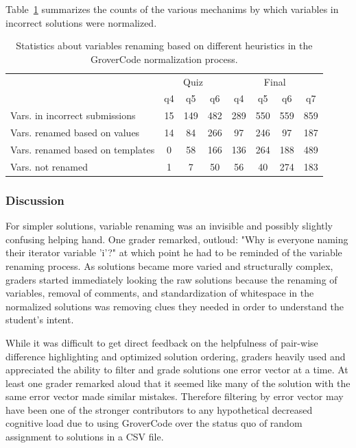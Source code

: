 Table~\ref{table:renametype} summarizes the counts of the various mechanims by which variables in incorrect solutions were normalized.

\begin{table}
\centering
\begin{tabular}{|l|c|c|c|c|c|c|c|}
\hline
& \multicolumn{3}{c|}{Quiz} & \multicolumn{4}{c|}{Final} \\
\cline{2-8}
& q4 & q5 & q6 & q4 & q5 & q6 & q7 \\
\hline
Vars. in incorrect submissions & 15 & 149 & 482 & 289 & 550 & 559 & 859 \\
\hline
Vars. renamed based on values & 14 & 84 & 266 & 97 & 246 & 97 & 187 \\
\hline
Vars. renamed based on templates & 0 & 58 & 166 & 136 & 264 & 188 & 489 \\
\hline
Vars. not renamed & 1 & 7 & 50 & 56 & 40 & 274 & 183 \\
\hline
\end{tabular}
\caption{Statistics about variables renaming based on different heuristics in the GroverCode normalization process.}
\label{table:renametype}
\end{table}
 
\subsubsection{Discussion}
For simpler solutions, variable renaming was an invisible and possibly slightly confusing helping hand. One grader remarked, outloud: "Why is everyone naming their iterator variable 'i'?" at which point he had to be reminded of the variable renaming process. As solutions became more varied and structurally complex, graders started immediately looking the raw solutions because the renaming of variables, removal of comments, and standardization of whitespace in the normalized solutions was removing clues they needed in order to understand the student's intent.

While it was difficult to get direct feedback on the helpfulness of pair-wise difference highlighting and optimized solution ordering, graders heavily used and appreciated the ability to filter and grade solutions one error vector at a time. At least one grader remarked aloud that it seemed like many of the solution with the same error vector made similar mistakes. Therefore filtering by error vector may have been one of the stronger contributors to any hypothetical decreased cognitive load due to using GroverCode over the status quo of random assignment to solutions in a CSV file.

